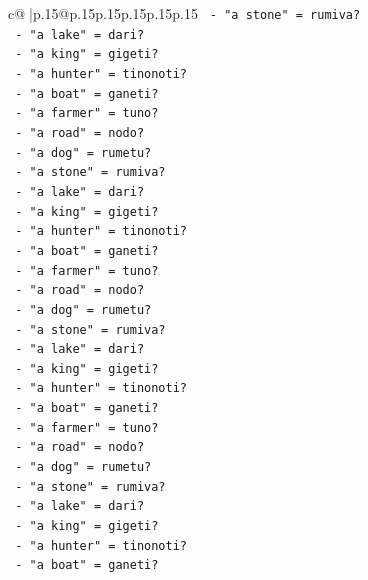 \documentclass{article}
\begin{document}
{\begin{supertabular}{c@{$\;$}|p{.15\linewidth}@{}p{.15\linewidth}p{.15\linewidth}p{.15\linewidth}p{.15\linewidth}p{.15\linewidth}}
{{{\texttt{                {-} "a stone" = rumiva?} \\
\texttt{                {-} "a lake" = dari?} \\
\texttt{                {-} "a king" = gigeti?} \\
\texttt{                {-} "a hunter" = tinonoti?} \\
\texttt{                {-} "a boat" = ganeti?} \\
\texttt{                {-} "a farmer" = tuno?} \\
\texttt{                {-} "a road" = nodo?} \\
\texttt{                {-} "a dog" = rumetu?} \\
\texttt{                {-} "a stone" = rumiva?} \\
\texttt{                {-} "a lake" = dari?} \\
\texttt{                {-} "a king" = gigeti?} \\
\texttt{                {-} "a hunter" = tinonoti?} \\
\texttt{                {-} "a boat" = ganeti?} \\
\texttt{                {-} "a farmer" = tuno?} \\
\texttt{                {-} "a road" = nodo?} \\
\texttt{                {-} "a dog" = rumetu?} \\
\texttt{                {-} "a stone" = rumiva?} \\
\texttt{                {-} "a lake" = dari?} \\
\texttt{                {-} "a king" = gigeti?} \\
\texttt{                {-} "a hunter" = tinonoti?} \\
\texttt{                {-} "a boat" = ganeti?} \\
\texttt{                {-} "a farmer" = tuno?} \\
\texttt{                {-} "a road" = nodo?} \\
\texttt{                {-} "a dog" = rumetu?} \\
\texttt{                {-} "a stone" = rumiva?} \\
\texttt{                {-} "a lake" = dari?} \\
\texttt{                {-} "a king" = gigeti?} \\
\texttt{                {-} "a hunter" = tinonoti?} \\
\texttt{                {-} "a boat" = ganeti?} \\
}}}
\end{supertabular}}
\end{document}
